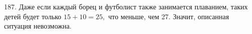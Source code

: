 187. Даже если каждый борец и футболист также занимается плаванием, таких детей будет только $15+10=25,$ что меньше, чем 27. Значит, описанная ситуация невозможна.\\
